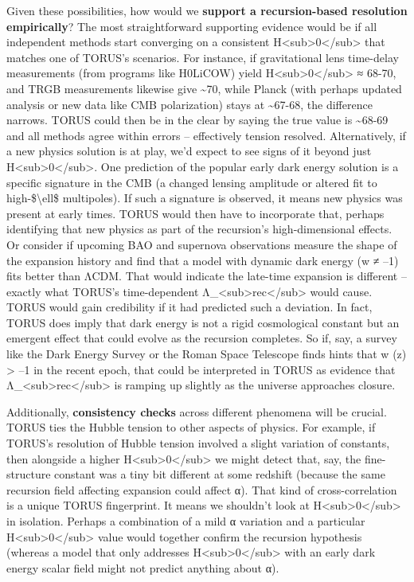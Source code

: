Given these possibilities, how would we \textbf{support a
recursion-based resolution empirically}? The most straightforward
supporting evidence would be if all independent methods start converging
on a consistent
H\textless{}sub\textgreater{}0\textless{}/sub\textgreater{} that matches
one of TORUS's scenarios. For instance, if gravitational lens time-delay
measurements (from programs like H0LiCOW) yield
H\textless{}sub\textgreater{}0\textless{}/sub\textgreater{} ≈ 68-70, and
TRGB measurements likewise give \textasciitilde{}70, while Planck (with
perhaps updated analysis or new data like CMB polarization) stays at
\textasciitilde{}67-68, the difference narrows. TORUS could then be in
the clear by saying the true value is \textasciitilde{}68-69 and all
methods agree within errors -- effectively tension resolved.
Alternatively, if a new physics solution is at play, we'd expect to see
signs of it beyond just
H\textless{}sub\textgreater{}0\textless{}/sub\textgreater{}. One
prediction of the popular early dark energy solution is a specific
signature in the CMB (a changed lensing amplitude or altered fit to
high-\$\textbackslash{}ell\$ multipoles). If such a signature is
observed, it means new physics was present at early times. TORUS would
then have to incorporate that, perhaps identifying that new physics as
part of the recursion's high-dimensional effects. Or consider if
upcoming BAO and supernova observations measure the shape of the
expansion history and find that a model with dynamic dark energy (w ≠
--1) fits better than ΛCDM. That would indicate the late-time expansion
is different -- exactly what TORUS's time-dependent
Λ\_\textless{}sub\textgreater{}rec\textless{}/sub\textgreater{} would
cause. TORUS would gain credibility if it had predicted such a
deviation. In fact, TORUS does imply that dark energy is not a rigid
cosmological constant but an emergent effect that could evolve as the
recursion completes​. So if, say, a survey like the Dark Energy Survey
or the Roman Space Telescope finds hints that w (z) \textgreater{} --1
in the recent epoch, that could be interpreted in TORUS as evidence that
Λ\_\textless{}sub\textgreater{}rec\textless{}/sub\textgreater{} is
ramping up slightly as the universe approaches closure.

Additionally, \textbf{consistency checks} across different phenomena
will be crucial. TORUS ties the Hubble tension to other aspects of
physics. For example, if TORUS's resolution of Hubble tension involved a
slight variation of constants, then alongside a higher
H\textless{}sub\textgreater{}0\textless{}/sub\textgreater{} we might
detect that, say, the fine-structure constant was a tiny bit different
at some redshift (because the same recursion field affecting expansion
could affect α). That kind of cross-correlation is a unique TORUS
fingerprint. It means we shouldn't look at
H\textless{}sub\textgreater{}0\textless{}/sub\textgreater{} in
isolation. Perhaps a combination of a mild α variation and a particular
H\textless{}sub\textgreater{}0\textless{}/sub\textgreater{} value would
together confirm the recursion hypothesis (whereas a model that only
addresses H\textless{}sub\textgreater{}0\textless{}/sub\textgreater{}
with an early dark energy scalar field might not predict anything about
α).

